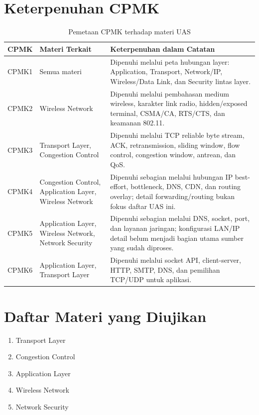 \documentclass[11pt,a4paper]{article}
\begin{document}
\section{Keterpenuhan CPMK}

\begin{table}[H]
\centering
\footnotesize
\begin{tabularx}{\textwidth}{|L{0.18\textwidth}|L{0.30\textwidth}|X|}
\hline
\textbf{CPMK} & \textbf{Materi Terkait} & \textbf{Keterpenuhan dalam Catatan} \\
\hline
CPMK1 & Semua materi & Dipenuhi melalui peta hubungan layer: Application, Transport, Network/IP, Wireless/Data Link, dan Security lintas layer. \\
\hline
CPMK2 & Wireless Network & Dipenuhi melalui pembahasan medium wireless, karakter link radio, hidden/exposed terminal, CSMA/CA, RTS/CTS, dan keamanan 802.11. \\
\hline
CPMK3 & Transport Layer, Congestion Control & Dipenuhi melalui TCP reliable byte stream, ACK, retransmission, sliding window, flow control, congestion window, antrean, dan QoS. \\
\hline
CPMK4 & Congestion Control, Application Layer, Wireless Network & Dipenuhi sebagian melalui hubungan IP best-effort, bottleneck, DNS, CDN, dan routing overlay; detail forwarding/routing bukan fokus daftar UAS ini. \\
\hline
CPMK5 & Application Layer, Wireless Network, Network Security & Dipenuhi sebagian melalui DNS, socket, port, dan layanan jaringan; konfigurasi LAN/IP detail belum menjadi bagian utama sumber yang sudah diproses. \\
\hline
CPMK6 & Application Layer, Transport Layer & Dipenuhi melalui socket API, client-server, HTTP, SMTP, DNS, dan pemilihan TCP/UDP untuk aplikasi. \\
\hline
\end{tabularx}
\caption{Pemetaan CPMK terhadap materi UAS}
\label{tab:keterpenuhan-cpmk}
\end{table}

\section{Daftar Materi yang Diujikan}

\begin{enumerate}
    \item Transport Layer
    \item Congestion Control
    \item Application Layer
    \item Wireless Network
    \item Network Security
\end{enumerate}
\end{document}
